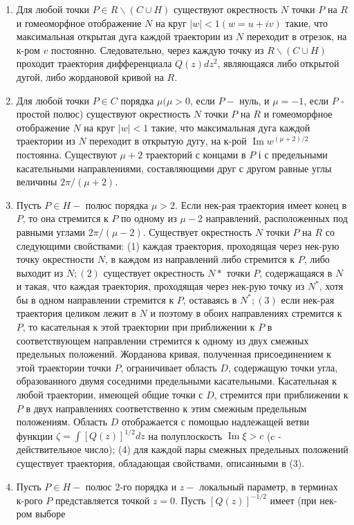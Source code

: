 \documentclass[10pt]{article}
\begin{document}
\begin{enumerate}

  \item Для любой точки $P \in R \backslash(C \cup H)$ существуют окрестность $N$ точки $P$ на $R$ и гомеоморфное отображение $N$ на круг $|w|<1(w=u+i v)$ такие, что максимальная открытая дуга каждой траектории из $N$ переходит в отрезок, на к-ром $v$ постоянно. Следовательно, через каждую точку из $R \backslash(C \cup H)$ проходит траектория дифференциала $Q(z) d z^{2}$, являющаяся либо открытой дугой, либо жордановой кривой на $R$.



  \item Для любой точки $P \in C$ порядка $\mu(\mu>0$, если $P-$ нуль, и $\mu=-1$, если $P$ - простой полюс) существуют окрестность $N$ точки $P$ на $R$ и гомеоморфное отображение $N$ на круг $|w|<1$ такие, что максимальная дуга каждой траектории из $N$ переходит в открытую дугу, на к-рой $\operatorname{Im} w^{(\mu+2) / 2}$ постоянна. Существуют $\mu+2$ траекторий с концами в $P$ і с предельными касательными направлениями, составляющими друг с другом равные углы величины $2 \pi /(\mu+2)$.



  \item Пусть $P \in H-$ полюс порядка $\mu>2$. Если нек-рая траектория имеет конец в $P$, то она стремится к $P$ по одному из $\mu-2$ направлений, расположенных под равными углами $2 \pi /(\mu-2)$. Существует окрестность $N$ точки $P$ на $R$ со следующими свойствами: (1) каждая траектория, проходящая через нек-рую точку окрестности $N$, в каждом из направлений либо стремится к $P$, либо выходит из $N ;(2)$ существует окрестность $N *$ точки $P$, содержащаяся в $N$ и такая, что каждая траектория, проходящая через нек-рую точку из $N^{*}$, хотя бы в одном направлении стремится к $P$, оставаясь в $N^{*} ;(3)$ если нек-рая траектория целиком лежит в $N$ и поэтому в обоих направлениях стремится к $P$, то касательная к этой траектории при приближении к $P$ в соответствующем направлении стремится к одному из двух смежных предельных положений. Жорданова кривая, полученная присоединением к этой траектории точки $P$, ограничивает область $D$, содержащую точки угла, образованного двумя соседними предельными касательными. Касательная к любой траектории, имеющей общие точки с $D$, стремится при приближении к $P$ в двух направлениях соответственно к этим смежным предельным положениям. Область $D$ отображается с помощью надлежащей ветви функции $\zeta=\int[Q(z)]^{1 / 2} d z$ на полуплоскость $\operatorname{Im} \xi>c$ (c - действительное число); (4) для каждой пары смежных предельных положений существует траектория, обладающая свойствами, описанными в (3).



  \item Пусть $P \in H-$ полюс 2-го порядка и $z-$ локальный параметр, в терминах к-рого $P$ представляется точкой $z=0$. Пусть $[Q(z)]^{-1 / 2}$ имеет (при нек-ром выборе



\end{enumerate}
\end{document}
